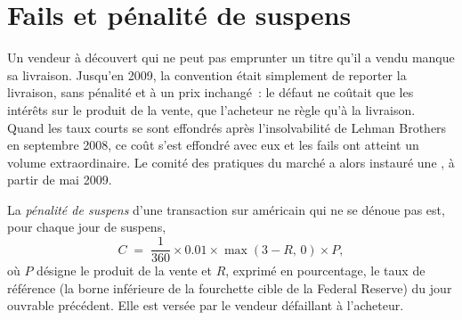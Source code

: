 \begin{omfigure}

\label{fig:m2:repo-and-specials:special}
\end{omfigure}

\section{Fails et pénalité de suspens}

Un vendeur à découvert qui ne peut pas emprunter un titre qu'il a vendu manque sa livraison. Jusqu'en
2009, la convention était simplement de reporter la livraison, sans pénalité et à
un prix inchangé~: le défaut ne coûtait que les intérêts sur le produit de la vente, que
l'acheteur ne règle qu'à la livraison. Quand les taux courts se sont effondrés après
l'insolvabilité de Lehman Brothers en septembre 2008, ce coût s'est effondré avec eux
et les fails ont atteint un volume extraordinaire. Le comité des pratiques du marché
a alors instauré une , à partir de mai 2009.

\begin{definition}\label{def:m2:repo-and-specials:fails}
La \emph{pénalité de suspens} d'une transaction sur  américain
qui ne se dénoue pas est, pour chaque jour de suspens,
\[
C \;=\; \frac{1}{360}\times 0.01 \times \max(3 - R,\,0) \times P,
\]
où $P$ désigne le produit de la vente et $R$, exprimé en pourcentage, le taux de référence (la borne
inférieure de la fourchette cible de la Federal Reserve) du jour ouvrable précédent. Elle
est versée par le vendeur défaillant à l'acheteur.
\end{definition}

